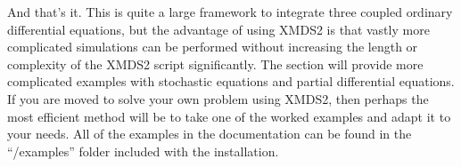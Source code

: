 \documentclass[letterpaper,10pt,english]{sphinxmanual}
\begin{document}
\sphinxAtStartPar
And that’s it.  This is quite a large framework to integrate three coupled ordinary differential equations, but the advantage of using XMDS2 is that vastly more complicated simulations can be performed without increasing the length or complexity of the XMDS2 script significantly.  The {\hyperref[\detokenize{worked_examples:workedexamples}]{}} section will provide more complicated examples with stochastic equations and partial differential equations.  If you are moved to solve your own problem using XMDS2, then perhaps the most efficient method will be to take one of the worked examples and adapt it to your needs.  All of the examples in the documentation can be found in the “/examples” folder included with the installation.

\ignorespaces 
\end{document}
